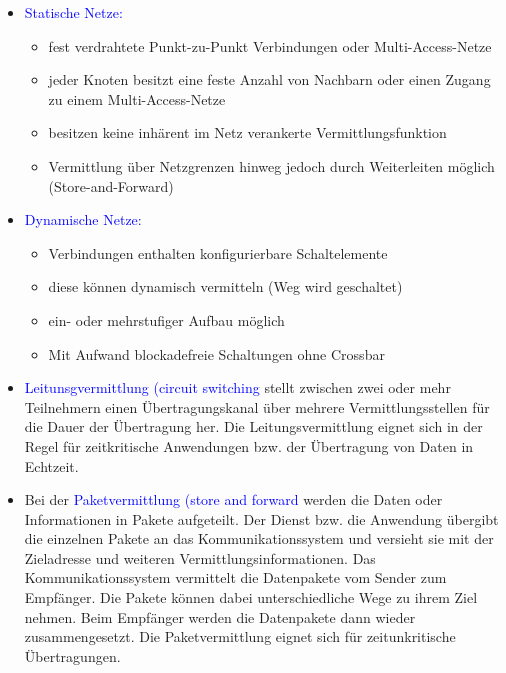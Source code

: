 \begin{itemize}
    \item \textcolor{blue}{Statische Netze:}
    \begin{itemize}
        \item fest verdrahtete Punkt-zu-Punkt Verbindungen oder Multi-Access-Netze
        \item jeder Knoten besitzt eine feste Anzahl von Nachbarn oder einen Zugang zu einem Multi-Access-Netze
        \item besitzen keine inhärent im Netz verankerte Vermittlungsfunktion
        \item Vermittlung über Netzgrenzen hinweg jedoch durch Weiterleiten möglich (Store-and-Forward)
    \end{itemize}
    \item \textcolor{blue}{Dynamische Netze:}
    \begin{itemize}
        \item Verbindungen enthalten konfigurierbare Schaltelemente
        \item diese können dynamisch vermitteln (Weg wird geschaltet)
        \item ein- oder mehrstufiger Aufbau möglich
        \item Mit Aufwand blockadefreie Schaltungen ohne Crossbar
    \end{itemize}
\end{itemize}

\begin{itemize}
    \item \textcolor{blue}{Leitunsgvermittlung (circuit switching} stellt zwischen zwei oder mehr Teilnehmern einen Übertragungskanal über mehrere Vermittlungsstellen für die Dauer der Übertragung her.
    Die Leitungsvermittlung eignet sich in der Regel für zeitkritische Anwendungen bzw. der Übertragung von Daten in Echtzeit.
    \item Bei der  \textcolor{blue}{Paketvermittlung (store and forward} werden die Daten oder Informationen in Pakete aufgeteilt. Der Dienst bzw. die Anwendung übergibt die einzelnen Pakete an das Kommunikationssystem und versieht sie mit der Zieladresse und weiteren Vermittlungsinformationen. Das Kommunikationssystem vermittelt die Datenpakete vom Sender zum Empfänger. Die Pakete können dabei unterschiedliche Wege zu ihrem Ziel nehmen. Beim Empfänger werden die Datenpakete dann wieder zusammengesetzt.
    Die Paketvermittlung eignet sich für zeitunkritische Übertragungen.
\end{itemize}

